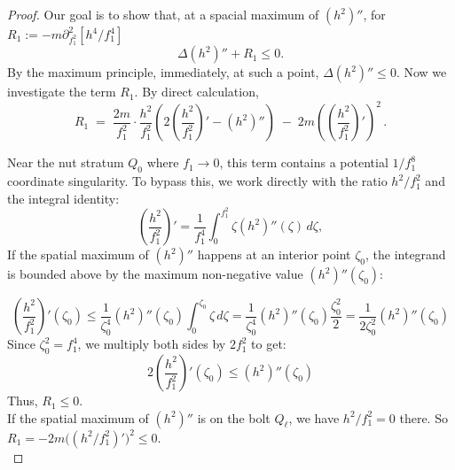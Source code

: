 \documentclass[10pt,a4paper]{amsart}
\begin{document}
\begin{proof}
	Our goal is to show that, at a spacial maximum of $(h^2)''$, for $R_1 := -m \partial^2_{f_1^2}[ h^4/f_1^4 ]$
	\[\Delta(h^2)''+R_1\leq 0. \]
	By the maximum principle, immediately, at such a point, $\Delta(h^2)''\leq 0$. Now we investigate the term $R_1$. By direct calculation,
	\[
	R_1 \;=\; \frac{2 m}{f_1^2} \cdot \frac{h^2}{f_1^2} \left( 2 \left( \frac{h^2}{f_1^2} \right)' - ( h^2 )'' \right) \;-\; 2 m \left( \left( \frac{h^2}{f_1^2} \right)' \right)^2 \,.
	\]
 
	
	Near the nut stratum $Q_0$ where $f_1 \to 0$, this term contains a potential $1/f_1^8$ coordinate singularity. To bypass this, we work directly with the ratio $h^2/f_1^2$ and the integral identity:
	\begin{equation}
		\left( \frac{h^2}{f_1^2} \right)' = \frac{1}{f_1^4} \int_0^{f_1^2} \zeta (h^2)''(\zeta) \, d\zeta,
	\end{equation}
 If the spatial maximum of $(h^2)''$ happens at an interior point  $\zeta_0$, the integrand is bounded above by the maximum non-negative value $(h^2)''(\zeta_0)$: 
 
 $$\left( \frac{h^2}{f_1^2} \right)'(\zeta_0) \le \frac{1}{\zeta_0^4} (h^2)''(\zeta_0) \int_0^{\zeta_0} \zeta \, d\zeta = \frac{1}{\zeta_0^4} (h^2)''(\zeta_0) \frac{\zeta_0^2}{2} = \frac{1}{2\zeta_0^2} (h^2)''(\zeta_0)$$
 Since $\zeta_0^2 = f_1^4$, we multiply both sides by $2 f_1^2$ to get: $$2 \left( \frac{h^2}{f_1^2} \right)'(\zeta_0) \le (h^2)''(\zeta_0)$$
 Thus, $R_1\leq 0$. \\
 
If the spatial maximum of $(h^2)''$ is on the bolt $Q_\ell$, we have $h^2/f_1^2 = 0$ there. So $R_1 = - 2 m \big( ( h^2 / f_1^2 )' \big)^2 \leq 0$.\\


\end{proof}
\end{document}
